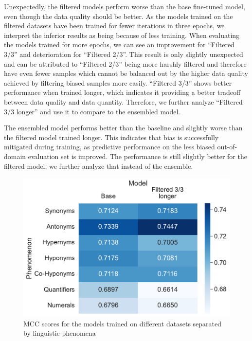 Unexpectedly, the filtered models perform worse than the base fine-tuned model, even though the data quality should be better. As the models trained on the filtered datasets have been trained for fewer iterations in three epochs, we interpret the inferior results as being because of less training. When evaluating the models trained for more epochs, we can see an improvement for \enquote{Filtered 3/3} and deterioration for \enquote{Filtered 2/3}. This result is only slightly unexpected and can be attributed to \enquote{Filtered 2/3} being more harshly filtered and therefore have even fewer samples which cannot be balanced out by the higher data quality achieved by filtering biased samples more easily. \enquote{Filtered 3/3} shows better performance when trained longer, which indicates it providing a better tradeoff between data quality and data quantity. Therefore, we further analyze \enquote{Filtered 3/3 longer} and use it to compare to the ensembled model.

The ensembled model performs better than the baseline and slightly worse than the filtered model trained longer. This indicates that bias is successfully mitigated during training, as predictive performance on the less biased out-of-domain evaluation set is improved. The performance is still slightly better for the filtered model, we further analyze that instead of the ensemble.

\begin{figure}[ht]
    \centering
    \includegraphics[width=0.9\columnwidth]{./images/metric_heatmaps_phenomena/all_words/matthews_correlation.pdf}
    \caption{\ac{MCC} scores for the models trained on different datasets separated by linguistic phenomena}
    \label{fig:metric-heatmap-phenomena-mcc}
\end{figure}

